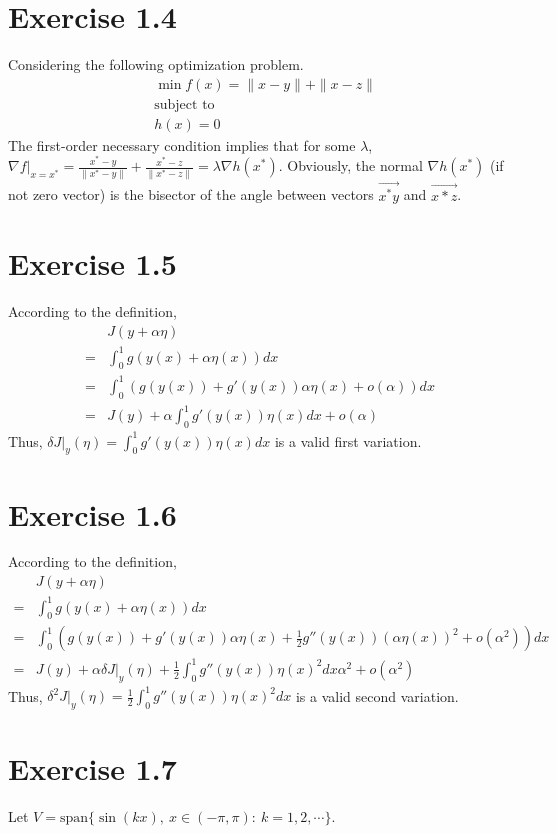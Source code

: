 \documentclass[11pt]{report}
\begin{document}
\section*{Exercise 1.4}
Considering the following optimization problem.
\begin{align*}
&\min f(x) = \|x-y\| + \|x-z\|\\
&\text{subject to}\\
&h(x) = 0
\end{align*}
The first-order necessary condition implies that for some $\lambda$, $\nabla f|_{x=x^*} = \frac{x^* - y}{\|x^*-y\|} + \frac{x^* - z}{\|x^*-z\|} = \lambda \nabla h(x^*)$. Obviously, the normal $\nabla h(x^*)$ (if not zero vector) is the bisector of the angle between vectors $\overrightarrow{x^*y}$ and $\overrightarrow{x*z}$.

\section*{Exercise 1.5}
According to the definition,
\begin{align*}
&J(y + \alpha \eta)\\
=&\int_{0}^{1}g(y(x)+\alpha \eta(x))dx\\
=&\int_{0}^{1}\left(g(y(x)) + g'(y(x)) \alpha \eta(x) + o(\alpha)\right)dx\\
=&J(y) + \alpha \int_{0}^{1} g'(y(x))\eta(x) dx + o(\alpha)
\end{align*}
Thus, $\delta J|_y(\eta) = \int_{0}^{1} g'(y(x))\eta(x) dx$ is a valid first variation.
\section*{Exercise 1.6}
According to the definition,
\begin{align*}
&J(y + \alpha \eta)\\
=&\int_{0}^{1}g(y(x)+\alpha \eta(x))dx\\
=&\int_{0}^{1}\left(g(y(x)) + g'(y(x)) \alpha \eta(x) + \frac{1}{2}g''(y(x)) (\alpha \eta(x))^2 + o(\alpha^2)\right)dx\\
=&J(y) + \alpha \delta J|_y(\eta) + \frac{1}{2}\int_{0}^{1}g''(y(x)) \eta(x)^2 dx \alpha^2 + o(\alpha^2)
\end{align*}
\noindent Thus, $\delta^2 J|_y(\eta) = \frac{1}{2}\int_{0}^{1}g''(y(x)) \eta(x)^2 dx$ is a valid second variation.

\section*{Exercise 1.7}
Let $V = \text{span}\{\sin(kx),~x \in (-\pi,\pi):~k=1,2,\cdots\}$.
\end{document}
